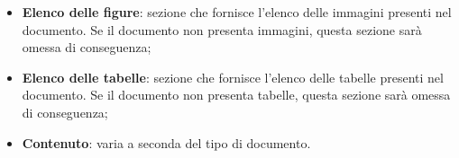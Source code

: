 \begin{itemize}
    \item \textbf{Elenco delle figure}: sezione che fornisce l'elenco delle immagini presenti nel documento. 
    Se il documento non presenta immagini, questa sezione sarà omessa di conseguenza;  
    \item \textbf{Elenco delle tabelle}: sezione che fornisce l'elenco delle tabelle presenti nel documento. 
    Se il documento non presenta tabelle, questa sezione sarà omessa di conseguenza; 
    \item \textbf{Contenuto}:
    varia a seconda del tipo di documento.
\end{itemize}